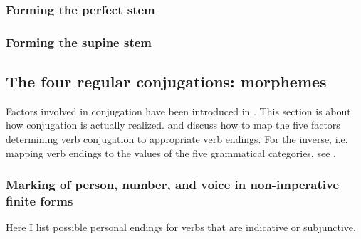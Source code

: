 \documentclass{article}
\newcommand*{\citesec}[1]{\S~{#1}}
\begin{document}
\subsubsection{Forming the perfect stem}


\subsubsection{Forming the supine stem}

\subsection{The four regular conjugations: morphemes}

Factors involved in conjugation have been introduced in .
This section is about how conjugation is actually realized.
 and 
discuss how to map the five factors determining verb conjugation 
to appropriate verb endings. 
For the inverse, i.e. mapping verb endings to the values of the five grammatical categories,
see \citet[\citesec{166}]{allen1903allen}.

\subsubsection{Marking of person, number, and voice in non-imperative finite forms}\label{sec:personal-marking}

Here I list possible personal endings for verbs that are indicative or subjunctive. 
\end{document}
